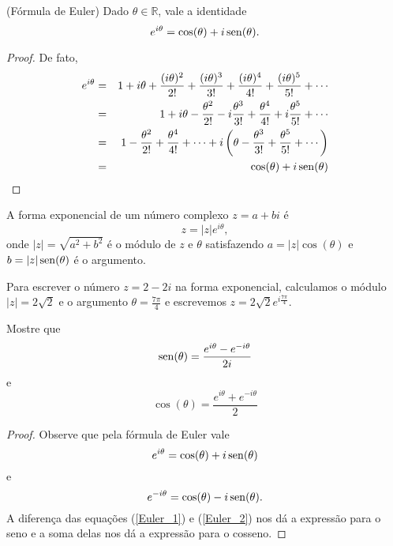 \begin{prop}(Fórmula de Euler) Dado $\theta\in\mathbb{R}$, vale a identidade
$$
e^{i\theta}=\cos(\theta)+i\operatorname{sen}(\theta).
$$
\end{prop}
\begin{proof}
De fato,
\begin{eqnarray*}
e^{i\theta}&=&1+i\theta+\frac{(i \theta)^2}{2!}+\frac{(i\theta)^3}{3!}+\frac{(i\theta)^4}{4!}+\frac{(i\theta)^5}{5!}+\cdots\\
&=&1+i\theta-\frac{\theta^2}{2!}-i\frac{\theta^3}{3!}+\frac{\theta^4}{4!}+i\frac{\theta^5}{5!}+\cdots\\
&=&1-\frac{\theta^2}{2!}+\frac{\theta^4}{4!}+\cdots    +i\left(\theta-\frac{\theta^3}{3!}+\frac{\theta^5}{5!}+\cdots\right)\\
&=&\cos(\theta)    +i\operatorname{sen}(\theta)
\end{eqnarray*}

\end{proof}

\begin{defn}A forma exponencial de um número complexo $z=a+bi$ é 
$$
z=|z|e^{i\theta},
$$
onde $|z|=\sqrt{a^2+b^2}$ é o módulo de $z$ e $\theta$ satisfazendo $a=|z|\cos(\theta)$ e $b=|z|\operatorname{sen}(\theta)$ é o argumento.
\end{defn}
\begin{ex}Para escrever o número $z=2-2i$ na forma exponencial, calculamos o módulo $|z|=2\sqrt{2}$ e o argumento $\theta=\frac{7\pi}{4}$ e escrevemos $z=2\sqrt{2}e^{i\frac{7\pi}{4}}$. 
\end{ex}

\begin{prob}{\label{prob_sin_euler}}Mostre que
$$
\operatorname{sen}(\theta)=\frac{e^{i\theta}-e^{-i\theta}}{2i}
$$
e
$$
\cos(\theta)=\frac{e^{i\theta}+e^{-i\theta}}{2}
$$
\end{prob}
\begin{proof}
Observe que pela fórmula de Euler vale
\begin{equation}{\label{Euler_1}}
e^{i\theta}=\cos(\theta)+i\operatorname{sen}(\theta)
\end{equation}
e
\begin{equation}{\label{Euler_2}}
e^{-i\theta}=\cos(\theta)-i\operatorname{sen}(\theta).
\end{equation}
A diferença das equações (\ref{Euler_1}) e (\ref{Euler_2}) nos dá a expressão para o seno e a soma delas nos dá a expressão para o cosseno.
\end{proof}

